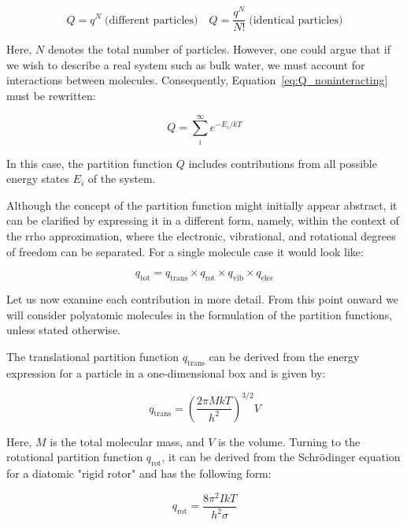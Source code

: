 \begin{equation}
    \label{eq:Q_noninteracting}
    Q = q^N \; \text{(different particles)} \quad Q = \frac{q^N}{N!} \; \text{(identical particles)}
\end{equation}

Here, $N$ denotes the total number of particles. However, one could argue that if we wish to describe a real system such as bulk water, we must account for interactions between molecules. Consequently, Equation~\ref{eq:Q_noninteracting} must be rewritten:

\begin{equation}
    Q = \sum_{i}^{\infty} e^{-E_i/kT}
\end{equation}

In this case, the partition function $Q$ includes contributions from all possible energy states $E_i$ of the system.

Although the concept of the partition function might initially appear abstract, it can be clarified by expressing it in a different form, namely, within the context of the \ac{rrho} approximation, where the electronic, vibrational, and rotational degrees of freedom can be separated. For a single molecule case it would look like:

\begin{equation}
    q_{\text{tot}} = q_{\text{trans}} \times q_{\text{rot}} \times q_{\text{vib}} \times q_{\text{elec}}
\end{equation}

Let us now examine each contribution in more detail. From this point onward we will consider polyatomic molecules in the formulation of the partition functions, unless stated otherwise.

The translational partition function $q_\text{trans}$ can be derived from the energy expression for a particle in a one-dimensional box and is given by:

\begin{equation}
    q_{\text{trans}} = \left(\frac{2\pi MkT}{h^2}\right)^{3/2} V
\end{equation}

Here, $M$ is the total molecular mass, and $V$ is the volume. Turning to the rotational partition function $q_\text{rot}$, it can be derived from the Schr\"odinger equation for a diatomic "rigid rotor" and has the following form:

\begin{equation}
    q_{\text{rot}} = \frac{8\pi^2IkT}{h^2\sigma}
\end{equation}


